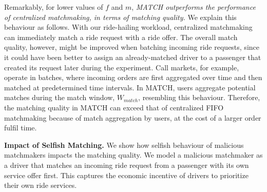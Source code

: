 Remarkably, for lower values of $ f $ and $ m $, \emph{MATCH outperforms the performance of centralized matchmaking, in terms of matching quality.}
We explain this behaviour as follows.
With our ride-hailing workload, centralized matchmaking can immediately match a ride request with a ride offer.
The overall match quality, however, might be improved when batching incoming ride requests, since it could have been better to assign an already-matched driver to a passenger that created its request later during the experiment.
Call markets, for example, operate in batches, where incoming orders are first aggregated over time and then matched at predetermined time intervals.
In MATCH, users aggregate potential matches during the match window, $ W_{match} $, resembling this behaviour.
Therefore, the matching quality in MATCH can exceed that of centralized FIFO matchmaking because of match aggregation by users, at the cost of a larger order fulfil time.

\textbf{Impact of Selfish Matching.}
We show how selfish behaviour of malicious matchmakers impacts the matching quality.
We model a malicious matchmaker as a driver that matches an incoming ride request from a passenger with its own service offer first.
This captures the economic incentive of drivers to prioritize their own ride services.

